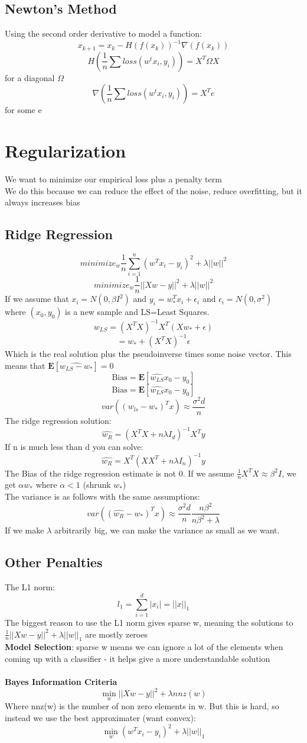 \documentclass{article}
\begin{document}
\subsection{Newton's Method}
Using the second order derivative to model a function:
$$x_{k+1} = x_k - H(f(x_k))^{-1} \nabla (f(x_k))$$
$$H(\frac{1}{n} \sum loss(w^tx_i, y_i)) = X^T \Omega X$$ for a diagonal $\Omega$
$$\nabla (\frac{1}{n} \sum loss(w^tx_i, y_i)) = X^Te$$ for some e

\section{Regularization}
We want to minimize our empirical loss plus a penalty term \\
We do this because we can reduce the effect of the noise, reduce overfitting, but it always increases bias
\subsection{Ridge Regression}
$$minimize_w \frac{1}{n} \sum_{i=1}^n (w^Tx_i - y_i)^2 + \lambda ||w||^2$$
$$minimize_w \frac{1}{n} ||Xw-y||^2 + \lambda ||w||^2$$
If we assume that $x_i = N(0,\beta I^2)$ and $y_i = w^T_*x_i + \epsilon_i$ and $\epsilon_i = N(0,\sigma^2)$ \\
where $(x_0,y_0)$ is a new sample and LS=Least Squares. 
$$w_{LS} = (X^TX)^{-1} X^T (Xw_* + \epsilon)$$
$$= w_* + (X^TX)^{-1}\epsilon$$
Which is the real solution plus the pseudoinverse times some noise vector. This means that $\mathbf{E}[\hat{w_{LS} - w_*}] = 0$
$$\textrm{Bias} = \mathbf{E}[\hat{w_{LS}}x_0 - y_0]$$ 
$$\textrm{Bias} = \mathbf{E}[\hat{w_{LS}}x_0 - y_0]$$
$$var((w_{ls} - w_*)^Tx) \approx \frac{\sigma^2 d}{n}$$
The ridge regression solution:
$$\hat{w_R} = (X^TX + n\lambda I_d)^{-1} X^Ty$$
If n is much less than d you can solve:
$$\hat{w_R} = X^T(XX^T + n\lambda I_n)^{-1} y$$
The Bias of the ridge regression estimate is not 0. If we assume $\frac{1}{n}X^TX \approx \beta^2 I$, we get $\alpha w_*$ where $\alpha < 1$ (shrunk $w_*$)\\
The variance is as follows with the same assumptions:
$$var((\hat{w_R} - w_*)^Tx) \approx \frac{\sigma^2 d}{n} \frac{n \beta^2}{n \beta^2 + \lambda}$$
If we make $\lambda$ arbitrarily big, we can make the variance as small as we want.

\subsection{Other Penalties}
The L1 norm:
$$l_1 = \sum_{i=1}^d |x_i| = ||x||_1$$
The biggest reason to use the L1 norm gives sparse w, meaning the solutions to $\frac{1}{n}||Xw - y||^2 + \lambda||w||_1$ are mostly zeroes \\
\textbf{Model Selection}: sparse w means we can ignore a lot of the elements when coming up with a classifier - it helps give a more understandable solution \\ \\
\textbf{Bayes Information Criteria}
$$\min_w ||Xw - y||^2 + \lambda nnz(w)$$
Where nnz(w) is the number of non zero elements in w. But this is hard, so instead we use the best approximater (want convex):
$$\min_w (w^Tx_i - y_i)^2+ \lambda ||w||_1$$
\end{document}
